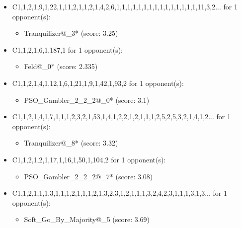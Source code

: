 \begin{appendices}
\begin{itemize}
    \item C1,1,2,1,9,1,22,1,11,2,1,1,2,1,4,2,6,1,1,1,1,1,1,1,1,1,1,1,1,1,1,1,11,3,2... for 1 opponent(s):
    \begin{multicols}{3}
         \begin{itemize}
            \item Tranquilizer@\_3* (score: 3.25)
        \end{itemize}
     \end{multicols}
     
    \item C1,1,2,1,6,1,187,1 for 1 opponent(s):
    \begin{multicols}{3}
         \begin{itemize}
            \item Feld@\_0* (score: 2.335)
        \end{itemize}
     \end{multicols}
     
    \item C1,1,2,1,4,1,12,1,6,1,21,1,9,1,42,1,93,2 for 1 opponent(s):
    \begin{multicols}{3}
         \begin{itemize}
            \item PSO\_Gambler\_2\_2\_2@\_0* (score: 3.1)
        \end{itemize}
     \end{multicols}
     
    \item C1,1,2,1,4,1,7,1,1,1,2,3,2,1,53,1,4,1,2,2,1,2,1,1,1,2,5,2,5,3,2,1,4,1,2... for 1 opponent(s):
    \begin{multicols}{3}
         \begin{itemize}
            \item Tranquilizer@\_8* (score: 3.32)
        \end{itemize}
     \end{multicols}
     
    \item C1,1,2,1,2,1,17,1,16,1,50,1,104,2 for 1 opponent(s):
    \begin{multicols}{3}
         \begin{itemize}
            \item PSO\_Gambler\_2\_2\_2@\_7* (score: 3.08)
        \end{itemize}
     \end{multicols}
     
    \item C1,1,2,1,1,1,3,1,1,1,2,1,1,1,2,1,3,2,3,1,2,1,1,1,3,2,4,2,3,1,1,1,3,1,3... for 1 opponent(s):
    \begin{multicols}{3}
         \begin{itemize}
            \item Soft\_Go\_By\_Majority@\_5 (score: 3.69)
        \end{itemize}
     \end{multicols}
     

\end{itemize}
\end{appendices}

